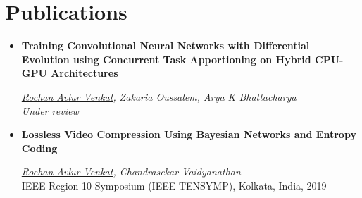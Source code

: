 \documentclass[a4paper,11pt]{article}
\newcommand{\resumeSubHeadingListStart}{\begin{itemize}[leftmargin=*]}
\newcommand{\resumeSubHeadingListEnd}{\end{itemize}}
\begin{document}
\section{Publications}
    \resumeSubHeadingListStart
        \item[] \textbf{Training Convolutional Neural Networks with Differential Evolution using Concurrent Task Apportioning on Hybrid CPU-GPU Architectures}
        \vspace*{-3pt}\begin{adjustwidth}{13pt}{}
            \textit{\underline{Rochan Avlur Venkat}, Zakaria Oussalem, Arya K Bhattacharya} \\ \textit{Under review}
        \end{adjustwidth}

        \item[] \textbf{Lossless Video Compression Using Bayesian Networks and Entropy Coding}
        \vspace*{-3pt}\begin{adjustwidth}{13pt}{}
            \textit{\underline{Rochan Avlur Venkat}, Chandrasekar Vaidyanathan} \\
            IEEE Region 10 Symposium (IEEE TENSYMP), Kolkata, India, 2019
        \end{adjustwidth}
    \resumeSubHeadingListEnd


\end{document}
